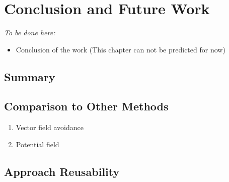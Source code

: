 \cleardoublepage
\chapter{Conclusion and Future Work}\label{ch:Conclusion}
    \emph{To be done here:}
    \begin{itemize}
        \item Conclusion of the work (This chapter can not be predicted for now)
    \end{itemize}



\section{Summary}
    
\section{Comparison to Other Methods}\label{s:OtherMethodsComparison}

\begin{enumerate}
	\item Vector field avoidance \cite{borenstein1991vector}
	\item Potential field \cite{koren1991potential}
\end{enumerate}

\section{Approach Reusability}\label{s:approachReusability}
